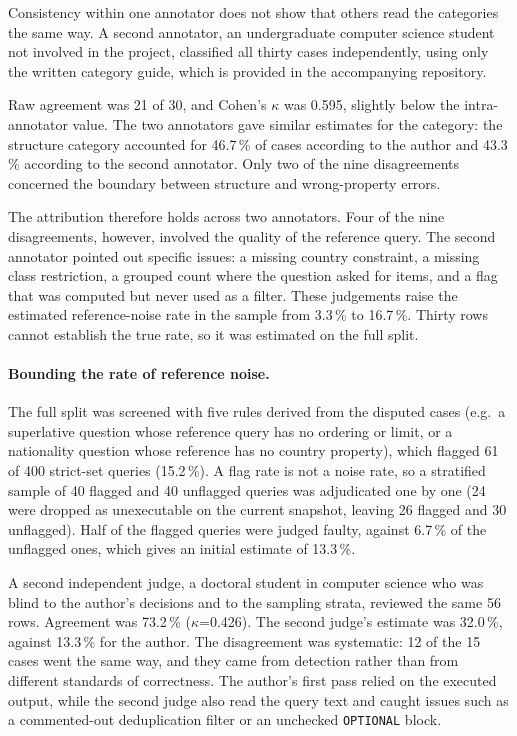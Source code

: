 Consistency within one annotator does not show that others read the categories the same way.
A second annotator, an undergraduate computer science student not involved in the project, classified all thirty cases independently, using only the written category guide, which is provided in the accompanying repository.

Raw agreement was 21 of 30, and Cohen's $\kappa$ was 0.595, slightly below the intra-annotator value.
The two annotators gave similar estimates for the category: the structure category accounted for 46.7\,\% of cases according to the author and 43.3\,\% according to the second annotator.
Only two of the nine disagreements concerned the boundary between structure and wrong-property errors.

The attribution therefore holds across two annotators.
Four of the nine disagreements, however, involved the quality of the reference query.
The second annotator pointed out specific issues: a missing country constraint, a missing class restriction, a grouped count where the question asked for items, and a flag that was computed but never used as a filter.
These judgements raise the estimated reference-noise rate in the sample from 3.3\,\% to 16.7\,\%.
Thirty rows cannot establish the true rate, so it was estimated on the full split.

\paragraph{Bounding the rate of reference noise.}

The full split was screened with five rules derived from the disputed cases (e.g.\ a superlative question whose reference query has no ordering or limit, or a nationality question whose reference has no country property), which flagged 61 of 400 strict-set queries (15.2\,\%).
A flag rate is not a noise rate, so a stratified sample of 40 flagged and 40 unflagged queries was adjudicated one by one (24 were dropped as unexecutable on the current snapshot, leaving 26 flagged and 30 unflagged).
Half of the flagged queries were judged faulty, against 6.7\,\% of the unflagged ones, which gives an initial estimate of 13.3\,\%.

A second independent judge, a doctoral student in computer science who was blind to the author's decisions and to the sampling strata, reviewed the same 56 rows.
Agreement was 73.2\,\% ($\kappa$=0.426).
The second judge's estimate was 32.0\,\%, against 13.3\,\% for the author.
The disagreement was systematic: 12 of the 15 cases went the same way, and they came from detection rather than from different standards of correctness. The author's first pass relied on the executed output, while the second judge also read the query text and caught issues such as a commented-out deduplication filter or an unchecked \texttt{OPTIONAL} block.

